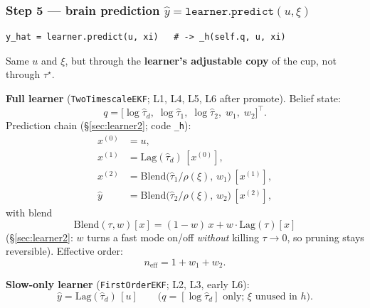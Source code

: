\documentclass[11pt,a4paper]{article}
\newcommand{\neff}{n_{\mathrm{eff}}}
\begin{document}
\subsubsection{Step 5 --- brain prediction $\hat y=\texttt{learner.predict}(u,\xi)$}

\begin{verbatim}
y_hat = learner.predict(u, xi)   # -> _h(self.q, u, xi)
\end{verbatim}

Same $u$ and $\xi$, but through the \textbf{learner's adjustable copy} of the
cup, not through $\tau^\star$.

\textbf{Full learner} (\texttt{TwoTimescaleEKF}; L1, L4, L5, L6 after promote).
Belief state:
\begin{equation}
q=\bigl[\log\hat\tau_d,\;\log\hat\tau_1,\;\log\hat\tau_2,\;w_1,\;w_2\bigr]^\top.
\label{eq:l4q}
\end{equation}
Prediction chain (\S\ref{sec:learner2}; code \texttt{\_h}):
\begin{align}
x^{(0)} &= u, \nonumber\\
x^{(1)} &= \mathrm{Lag}(\hat\tau_d)\,[x^{(0)}], \nonumber\\
x^{(2)} &= \mathrm{Blend}\bigl(\hat\tau_1/\rho(\xi),\,w_1\bigr)\,[x^{(1)}], \nonumber\\
\hat y &= \mathrm{Blend}\bigl(\hat\tau_2/\rho(\xi),\,w_2\bigr)\,[x^{(2)}],
\label{eq:l4h}
\end{align}
with blend
\begin{equation}
\mathrm{Blend}(\tau,w)[x]=(1-w)\,x + w\cdot\mathrm{Lag}(\tau)[x]
\label{eq:l4blend}
\end{equation}
(\S\ref{sec:learner2}: $w$ turns a fast mode on/off \emph{without} killing
$\tau\to0$, so pruning stays reversible).  Effective order:
\begin{equation}
\neff = 1 + w_1 + w_2.
\label{eq:l4neff}
\end{equation}

\textbf{Slow-only learner} (\texttt{FirstOrderEKF}; L2, L3, early L6):
\begin{equation}
\hat y = \mathrm{Lag}(\hat\tau_d)\,[u]
\qquad\text{($q=[\log\hat\tau_d]$ only; $\xi$ unused in $h$).}
\label{eq:l4h1}
\end{equation}
\end{document}
